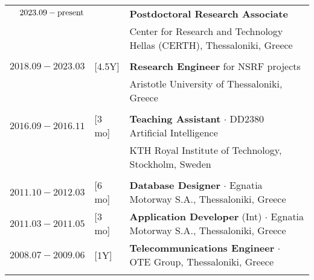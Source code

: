 \documentclass[a4paper,10pt,twoside]{article}
\begin{document}
\begin{tabular}{rlp{12cm}}
$2023.09 - \hfill \textnormal{present} \hfill$ & & \textbf{Postdoctoral Research Associate} \\
                                               & & Center for Research and Technology Hellas (CERTH), Thessaloniki, Greece\\
&\\
  $2018.09 - 2023.03$ & \hspace{-0.4cm} [4.5Y] & \textbf{Research Engineer} for NSRF projects\\
                      & \hspace{-0.4cm}        & Aristotle University of Thessaloniki, Greece\\
&\\
$2016.09 - 2016.11$   & \hspace{-0.4cm} [3 mo] & \textbf{Teaching Assistant} $\cdot$ DD2380 Artificial Intelligence\\
                      & \hspace{-0.4cm}        & KTH Royal Institute of Technology, Stockholm, Sweden\\
&\\
$2011.10 - 2012.03$   & \hspace{-0.4cm} [6 mo]& \textbf{Database Designer} $\cdot$ Egnatia Motorway S.A., Thessaloniki, Greece\\
$2011.03 - 2011.05$   & \hspace{-0.4cm} [3 mo]& \textbf{Application Developer} (Int) $\cdot$ Egnatia Motorway S.A., Thessaloniki, Greece\\
$2008.07 - 2009.06$   & \hspace{-0.4cm} [1Y] & \textbf{Telecommunications Engineer} $\cdot$ OTE Group, Thessaloniki, Greece\\
&\\
\end{tabular}


\end{document}
